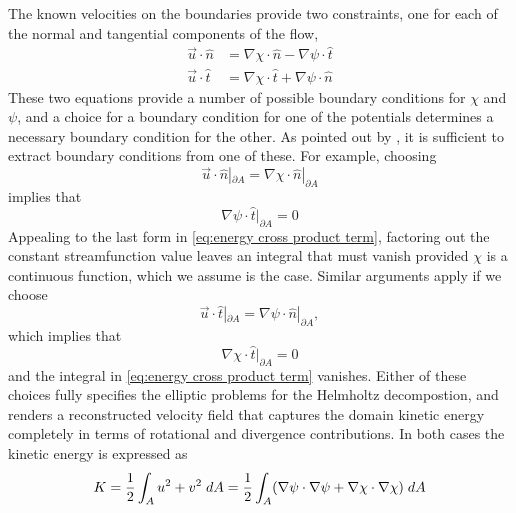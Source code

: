 \documentclass[draft]{agujournal2019}
\begin{document}
The known velocities on the boundaries provide two constraints, one for each of the normal and tangential components of the flow,
\begin{subequations}
    \begin{align}
        \vec{u}\cdot \hat{n} &= \nabla \chi \cdot \hat{n} - \nabla \psi \cdot \hat{t} \\
        \vec{u} \cdot \hat{t} &= \nabla \chi \cdot \hat{t} + \nabla \psi \cdot \hat{n}
    \end{align}
\end{subequations}
These two equations provide a number of possible boundary conditions for $\chi$ and $\psi$, and a choice for a boundary condition for one of the potentials determines a necessary boundary condition for the other. As pointed out by \cite{Fox-Kemper2003}, it is sufficient to extract boundary conditions from one of these.  For example, choosing 
\begin{equation}
    \vec{u} \cdot \hat{n}|_{\partial A} = \nabla \chi \cdot \hat{n}|_{\partial A} \label{eq:normal velocity matching}
\end{equation}
implies that
\begin{equation}
    \nabla \psi \cdot \hat{t} |_{\partial A} = 0
\end{equation}
 Appealing to the last form in \eqref{eq:energy cross product term}, factoring out the constant streamfunction value leaves an integral that must vanish provided $\chi$ is a continuous function, which we assume is the case. Similar arguments apply if we choose
 \begin{equation}
    \vec{u} \cdot \hat{t}|_{\partial A} = \nabla \psi \cdot \hat{n}|_{\partial A},
\end{equation}
which implies that
\begin{equation}
    \nabla \chi \cdot \hat{t} |_{\partial A} = 0
\end{equation}
and the integral in \eqref{eq:energy cross product term} vanishes. Either of these choices fully specifies the elliptic problems for the Helmholtz decompostion, and renders a reconstructed velocity field that captures the domain kinetic energy completely in terms of rotational and divergence contributions. In both cases the kinetic energy is expressed as
\begin{equation}
    K = \frac{1}{2}\int_A u^2 + v^2 \hspace{1mm}dA = \frac{1}{2}\int_A (\nabla \psi \cdot \nabla \psi + \nabla \chi \cdot \nabla \chi ) \hspace{1mm}dA \label{eq:helmholz decomposition energy}
\end{equation}
\end{document}
